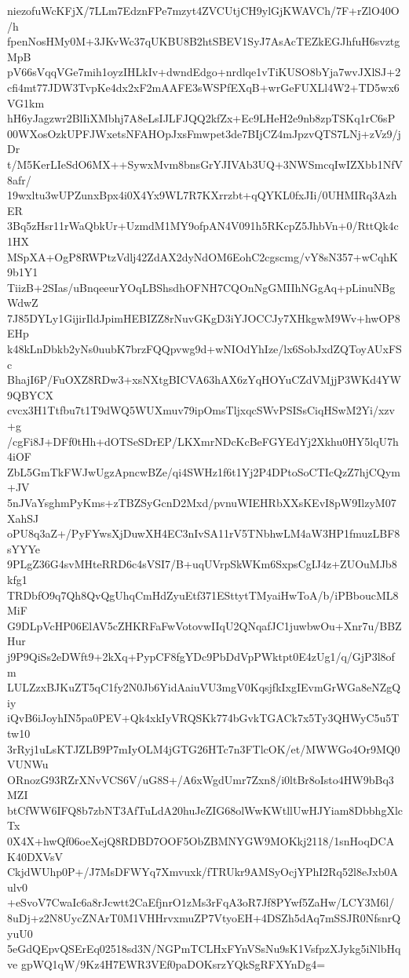 niezofuWcKFjX/7LLm7EdznFPe7mzyt4ZVCUtjCH9ylGjKWAVCh/7F+rZlO40O/h
fpenNosHMy0M+3JKvWc37qUKBU8B2htSBEV1SyJ7AsAcTEZkEGJhfuH6svztgMpB
pV66sVqqVGe7mih1oyzIHLkIv+dwndEdgo+nrdlqe1vTiKUSO8bYja7wvJXlSJ+2
cfi4mt77JDW3TvpKe4dx2xF2mAAFE3sWSPfEXqB+wrGeFUXLl4W2+TD5wx6VG1km
hH6yJagzwr2BlIiXMbhj7A8eLsIJLFJQQ2kfZx+Ec9LHeH2e9nb8zpTSKq1rC6sP
00WXosOzkUPFJWxetsNFAHOpJxsFmwpet3de7BIjCZ4mJpzvQTS7LNj+zVz9/jDr
t/M5KerLIeSdO6MX++SywxMvm8bnsGrYJIVAb3UQ+3NWSmcqIwIZXbb1NfV8afr/
19wxltu3wUPZunxBpx4i0X4Yx9WL7R7KXrrzbt+qQYKL0fxJIi/0UHMIRq3AzhER
3Bq5zHsr11rWaQbkUr+UzmdM1MY9ofpAN4V091h5RKcpZ5JhbVn+0/RttQk4c1HX
MSpXA+OgP8RWPtzVdlj42ZdAX2dyNdOM6EohC2cgscmg/vY8sN357+wCqhK9b1Y1
TiizB+2SIas/uBnqeeurYOqLBShsdhOFNH7CQOnNgGMIIhNGgAq+pLinuNBgWdwZ
7J85DYLy1GijirIldJpimHEBIZZ8rNuvGKgD3iYJOCCJy7XHkgwM9Wv+hwOP8EHp
k48kLnDbkb2yNs0uubK7brzFQQpvwg9d+wNIOdYhIze/lx6SobJxdZQToyAUxFSc
BhajI6P/FuOXZ8RDw3+xsNXtgBICVA63hAX6zYqHOYuCZdVMjjP3WKd4YW9QBYCX
cvcx3H1Ttfbu7t1T9dWQ5WUXmuv79ipOmsTljxqcSWvPSISsCiqHSwM2Yi/xzv+g
/cgFi8J+DFf0tHh+dOTSeSDrEP/LKXmrNDcKcBeFGYEdYj2Xkhu0HY5lqU7h4iOF
ZbL5GmTkFWJwUgzApncwBZe/qi4SWHz1f6t1Yj2P4DPtoSoCTIcQzZ7hjCQym+JV
5nJVaYsghmPyKms+zTBZSyGcnD2Mxd/pvnuWIEHRbXXsKEvI8pW9IlzyM07XahSJ
oPU8q3aZ+/PyFYwsXjDuwXH4EC3nIvSA11rV5TNbhwLM4aW3HP1fmuzLBF8sYYYe
9PLgZ36G4svMHteRRD6c4sVSI7/B+uqUVrpSkWKm6SxpsCgIJ4z+ZUOuMJb8kfg1
TRDbfO9q7Qh8QvQgUhqCmHdZyuEtf371ESttytTMyaiHwToA/b/iPBboucML8MiF
G9DLpVcHP06ElAV5cZHKRFaFwVotovwIIqU2QNqafJC1juwbwOu+Xnr7u/BBZHur
j9P9QiSs2eDWft9+2kXq+PypCF8fgYDc9PbDdVpPWktpt0E4zUg1/q/GjP3l8ofm
LULZzxBJKuZT5qC1fy2N0Jb6YidAaiuVU3mgV0KqsjfkIxgIEvmGrWGa8eNZgQiy
iQvB6iJoyhIN5pa0PEV+Qk4xkIyVRQSKk774bGvkTGACk7x5Ty3QHWyC5u5Ttw10
3rRyj1uLsKTJZLB9P7mIyOLM4jGTG26HTc7n3FTlcOK/et/MWWGo4Or9MQ0VUNWu
ORnozG93RZrXNvVCS6V/uG8S+/A6xWgdUmr7Zxn8/i0ltBr8oIsto4HW9bBq3MZI
btCfWW6IFQ8b7zbNT3AfTuLdA20huJeZIG68olWwKWtllUwHJYiam8DbbhgXlcTx
0X4X+hwQf06oeXejQ8RDBD7OOF5ObZBMNYGW9MOKkj2118/1snHoqDCAK40DXVsV
CkjdWUhp0P+/J7MsDFWYq7Xmvuxk/fTRUkr9AMSyOcjYPhI2Rq52l8eJxb0Aulv0
+eSvoV7CwaIc6a8rJcwtt2CaEfjnrO1zMs3rFqA3oR7Jf8PYwf5ZaHw/LCY3M6l/
8uDj+z2N8UycZNArT0M1VHHrvxmuZP7VtyoEH+4DSZh5dAq7mSSJR0NfsnrQyuU0
5eGdQEpvQSErEq02518sd3N/NGPmTCLHxFYnVSsNu9sK1VsfpzXJykg5iNlbHqve
gpWQ1qW/9Kz4H7EWR3VEf0paDOKsrzYQkSgRFXYnDg4=
